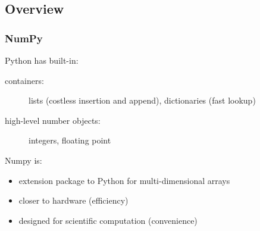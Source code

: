 \documentclass[colorlinks]{beamer}
\begin{document}
\subsection{Overview}
\begin{frame}[fragile]\frametitle{NumPy}
\begin{block}{}

Python has built-in:
\begin{description}
    \item[containers: ]  lists (costless insertion and append), dictionaries (fast lookup)
\item[high-level number objects: ]integers, floating point

\end{description}

\end{block}
\begin{block}{}


Numpy is:
\begin{itemize}
    \item extension package to Python for multi-dimensional arrays
\item closer to hardware (efficiency)
\item designed for scientific computation (convenience)\end{itemize}
\end{block}

\end{frame}
\end{document}
